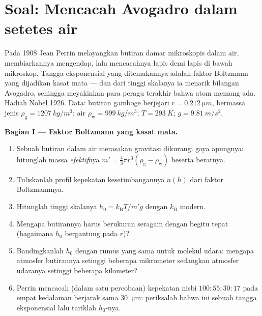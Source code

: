 \section{Soal: Mencacah Avogadro dalam setetes air}

\begin{problem}\label{pb:b3:canonical-ensemble:1}
Pada 1908 Jean Perrin melayangkan butiran damar mikroskopis dalam air,
membiarkannya mengendap, lalu mencacahnya lapis demi lapis di bawah
mikroskop. Tangga eksponensial yang ditemukannya adalah faktor Boltzmann
yang dijadikan kasat mata --- dan dari tinggi skalanya ia menarik
bilangan Avogadro, sehingga meyakinkan para peragu terakhir bahwa atom
memang ada. Hadiah Nobel 1926. Data: butiran gamboge berjejari $r =
\qty{0.212}{\micro m}$, bermassa jenis $\rho_{\text{g}} =
\qty{1207}{kg/m^3}$; air $\rho_{\text{w}} = \qty{999}{kg/m^3}$;
$T = \qty{293}{K}$; $g = \qty{9.81}{m/s^2}$.

\medskip\noindent\textbf{Bagian I --- Faktor Boltzmann yang kasat mata.}
\begin{enumerate}
  \item Sebuah butiran dalam air merasakan gravitasi dikurangi gaya
        apungnya: hitunglah massa \emph{efektif}nya $m' = \tfrac43\pi r^3(\rho_{\text{g}}
        - \rho_{\text{w}})$ beserta beratnya.
  \item Tuliskanlah profil kepekatan kesetimbangannya $n(h)$ dari
        faktor Boltzmannnya.
  \item Hitunglah tinggi skalanya $h_0 = k_{\text{B}}T/m'g$ dengan
        $k_{\text{B}}$ modern.
  \item Mengapa butirannya harus berukuran seragam dengan begitu tepat
        (bagaimana $h_0$ bergantung pada $r$)?
  \item Bandingkanlah $h_0$ dengan rumus yang sama untuk molekul udara:
        mengapa atmosfer butirannya setinggi beberapa mikrometer
        sedangkan atmosfer udaranya setinggi beberapa kilometer?
  \item Perrin mencacah (dalam satu percobaan) kepekatan nisbi
        $100 : 55 : 30 : 17$ pada empat kedalaman berjarak sama
        \qty{30}{\micro m}: periksalah bahwa ini sebuah tangga
        eksponensial lalu tariklah $h_0$-nya.
\end{enumerate}


\end{problem}
